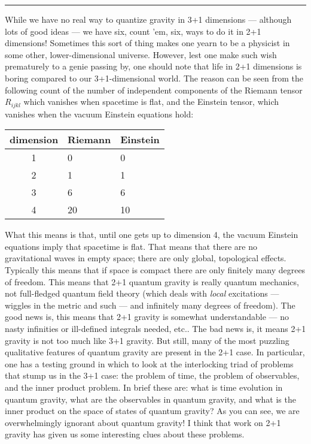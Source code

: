 \documentclass{article}
\def\tightlist{}
\renewcommand{\texttt}[1]{%
  \begingroup
  \ttfamily
  \begingroup\lccode`~=`/\lowercase{\endgroup\def~}{/\discretionary{}{}{}}%
  \begingroup\lccode`~=`[\lowercase{\endgroup\def~}{[\discretionary{}{}{}}%
  \begingroup\lccode`~=`.\lowercase{\endgroup\def~}{.\discretionary{}{}{}}%
  \catcode`/=\active\catcode`[=\active\catcode`.=\active
  \scantokens{#1\noexpand}%
  \endgroup
}
\begin{document}
\begin{center}\rule{0.5\linewidth}{0.5pt}\end{center}


While we have no real way to quantize gravity in 3+1 dimensions ---
although lots of good ideas --- we have six, count 'em, six, ways to do
it in 2+1 dimensions! Sometimes this sort of thing makes one yearn to be
a physicist in some other, lower-dimensional universe. However, lest one
make such wish prematurely to a genie passing by, one should note that
life in 2+1 dimensions is boring compared to our 3+1-dimensional world.
The reason can be seen from the following count of the number of
independent components of the Riemann tensor \(R_{ijkl}\) which vanishes
when spacetime is flat, and the Einstein tensor, which vanishes when the
vacuum Einstein equations hold:

\begin{longtable}[]{@{}cll@{}}
\toprule
dimension & Riemann & Einstein\tabularnewline
\midrule
\endhead
1 & 0 & 0\tabularnewline
2 & 1 & 1\tabularnewline
3 & 6 & 6\tabularnewline
4 & 20 & 10\tabularnewline
\bottomrule
\end{longtable}

What this means is that, until one gets up to dimension 4, the vacuum
Einstein equations imply that spacetime is flat. That means that there
are no gravitational waves in empty space; there are only global,
topological effects. Typically this means that if space is compact there
are only finitely many degrees of freedom. This means that 2+1 quantum
gravity is really quantum mechanics, not full-fledged quantum field
theory (which deals with \emph{local} excitations --- wiggles in the
metric and such --- and infinitely many degrees of freedom). The good
news is, this means that 2+1 gravity is somewhat understandable --- no
nasty infinities or ill-defined integrals needed, etc.. The bad news is,
it means 2+1 gravity is not too much like 3+1 gravity. But still, many
of the most puzzling qualitative features of quantum gravity are present
in the 2+1 case. In particular, one has a testing ground in which to
look at the interlocking triad of problems that stump us in the 3+1
case: the problem of time, the problem of observables, and the inner
product problem. In brief these are: what is time evolution in quantum
gravity, what are the observables in quantum gravity, and what is the
inner product on the space of states of quantum gravity? As you can see,
we are overwhelmingly ignorant about quantum gravity! I think that work
on 2+1 gravity has given us some interesting clues about these problems.
\end{document}
